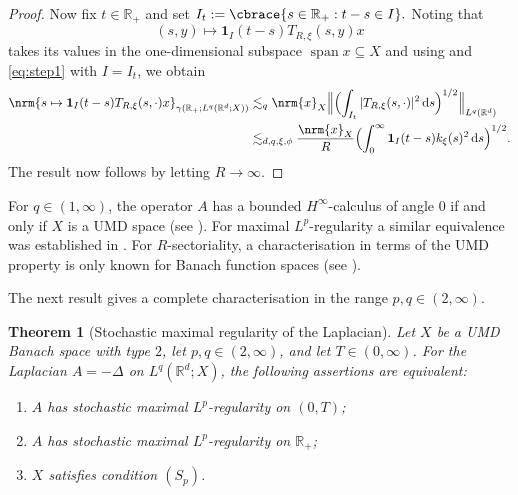 \documentclass{amsart}
\theoremstyle{plain}
\newtheorem{theorem}{Theorem}[section]
\theoremstyle{remark}
\theoremstyle{plain}
\numberwithin{equation}{section}
\newcommand{\R}{\mathbb R}
\newcommand{\1}{\mathbf 1}
\newcommand{\dd}{\,{\rm d}}
\DeclarePairedDelimiter\cbrace\{\}
\DeclarePairedDelimiter{\nrm}\lVert\rVert
\newcommand{\nrmB}[1]{\Bigl\|#1\Bigr\|}
\newcommand{\brB}[1]{\Bigl(#1\Bigr)}
\DeclareMathOperator{\spn}{span}
\begin{document}
\begin{proof}
Now fix $t\in\R_+$ and set
$
  I_t:
   =
  \cbrace{s\in\R_+: t-s\in I}.
$
Noting that $$(s,y)\mapsto \1_I(t-s)T_{R,\xi}(s,y)x$$ takes its values in the one-dimensional subspace $\spn{x} \subseteq X$ and using \cite[Proposition 9.3.2]{HNVW2} and \eqref{eq:step1} with $I=I_t$, we obtain
\[
\begin{aligned}
  \nrm{
    s\mapsto \1_I(t-s)T_{R,\xi}(s,\cdot)x
  }_{\gamma(\R_+;L^q(\R^d;X))}
  &
  \lesssim_q
  \nrm{x}_X
  \nrmB{
    \brB{\int_{I_t}|T_{R,\xi}(s,\cdot)|^2\dd s}^{1/2}
  }_{L^q(\R^d)}
  \\
  &
  \lesssim_{d,q,\xi,\phi}
  \frac{\nrm{x}_X}{R}
  \brB{\int_0^\infty \1_I(t-s)k_\xi(s)^2\dd s}^{1/2}.
\end{aligned}
\]
The result now follows by letting $R\to\infty$.
\end{proof}

For $q\in (1, \infty)$, the operator $A$ has a bounded $H^\infty$-calculus of angle $0$ if and only if $X$ is a UMD space (see \cite[Theorem 10.2.25, Remark 10.2.26]{HNVW2}). For maximal $L^p$-regularity a similar equivalence was established in \cite[Theorem 17.4.1]{HNVW3}. For $R$-sectoriality, a characterisation in terms of the UMD property is only known for Banach function spaces (see \cite[Theorem 2.4.9]{KLW19}).

The next result gives a complete characterisation in the range $p,q\in(2,\infty)$.

\begin{theorem}[Stochastic maximal regularity of the Laplacian]
\label{thm:large-scale-plane-wave-extraction}
Let $X$ be a UMD Banach space with type $2$, let $p,q\in(2,\infty)$, and let $T\in(0,\infty)$. For the Laplacian $A=-\Delta$ on $L^q(\R^d;X)$, the following assertions are
equivalent:
\begin{enumerate}[label={\rm(\arabic*)}, leftmargin=*]
\item\label{it1:large-scale-plane-wave-extraction}
$A$ has stochastic maximal $L^p$-regularity on $(0,T)$;
\item\label{it2:large-scale-plane-wave-extraction}
$A$ has stochastic maximal $L^p$-regularity on $\R_+$;
\item\label{it3:large-scale-plane-wave-extraction}
$X$ satisfies condition $(S_p)$.
\end{enumerate}
\end{theorem}
\end{document}
